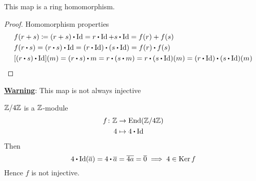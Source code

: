 \documentclass[../Main.tex]{subfiles}
\begin{document}
\begin{claim}
	This map is a ring homomorphism.
\end{claim}
\begin{proof}
	Homomorphism properties
	\begin{align*}
	&f(r+s)\coloneqq (r+s)\rdot \Id = r\rdot \Id + s\rdot \Id = f(r)+f(s)\\
	&f(r\rdot s) = (r\rdot s)\rdot \Id = (r\rdot \Id) \rdot (s\rdot \Id) = f(r)\rdot f(s)\\
	&[(r\rdot s)\rdot \Id](m)=(r\rdot s)\rdot m = r\rdot (s\rdot m)= r\rdot (s\rdot \Id)(m) = (r\rdot \Id)\rdot (s\rdot \Id)(m)
	\end{align*}
\end{proof}
\textbf{\textcolor{BrickRed}{\underline{Warning}}}: This map is not always injective
\begin{example}
	$\mathbb{Z}/4\mathbb{Z}$ is a $\mathbb{Z}$-module
	\begin{align*}
	f\colon \Z&\to \End(\modZ{4}) \\
	4&\mapsto 4\rdot \Id
	\end{align*}
	Then
	\[4\rdot \Id(\obar{a}) = 4\rdot \obar{a} = \obar{4a} = \obar{0} \implies 4 \in \Ker f\]
	Hence $f$ is not injective.
\end{example}
\end{document}
